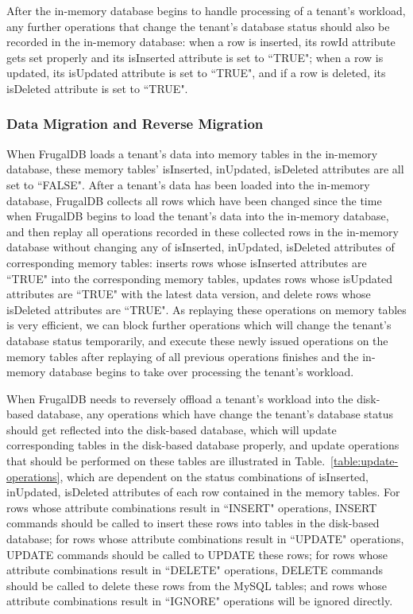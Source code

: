 After the in-memory database begins to handle processing of a tenant's workload, any further operations that change the tenant's database status should also be recorded in the in-memory database: when a row is inserted, its rowId attribute gets set properly and its isInserted attribute is set to ``TRUE"; when a row is updated, its isUpdated attribute is set to ``TRUE", and if a row is deleted, its isDeleted attribute is set to ``TRUE".

\subsubsection{Data Migration and Reverse Migration}

When FrugalDB loads a tenant's data into memory tables in the in-memory database, these memory tables' isInserted, inUpdated, isDeleted attributes are all set to ``FALSE". After a tenant's data has been loaded into the in-memory database, FrugalDB collects all rows which have been changed since the time when FrugalDB begins to load the tenant's data into the in-memory database, and then replay all operations recorded in these collected rows in the in-memory database without changing any of isInserted, inUpdated, isDeleted attributes of corresponding memory tables: inserts rows whose isInserted attributes are ``TRUE" into the corresponding memory tables, updates rows whose isUpdated attributes are ``TRUE" with the latest data version, and delete rows whose isDeleted attributes are ``TRUE". As replaying these operations on memory tables is very efficient, we can block further operations which will change the tenant's database status temporarily, and execute these newly issued operations on the memory tables after replaying of all previous operations finishes and the in-memory database begins to take over processing the tenant's workload.

When FrugalDB needs to reversely offload a tenant's workload into the disk-based database, any operations which have change the tenant's database status should get reflected into the disk-based database, which will update corresponding tables in the disk-based database properly, and update operations that should be performed on these tables are illustrated in Table.~\ref{table:update-operations}, which are dependent on the status combinations of isInserted, inUpdated, isDeleted attributes of each row contained in the memory tables. For rows whose attribute combinations result in ``INSERT" operations, INSERT commands should be called to insert these rows into tables in the disk-based database; for rows whose attribute combinations result in ``UPDATE" operations, UPDATE commands should be called to UPDATE these rows; for rows whose attribute combinations result in ``DELETE" operations, DELETE commands should be called to delete these rows from the MySQL tables; and rows whose attribute combinations result in ``IGNORE" operations will be ignored directly.

